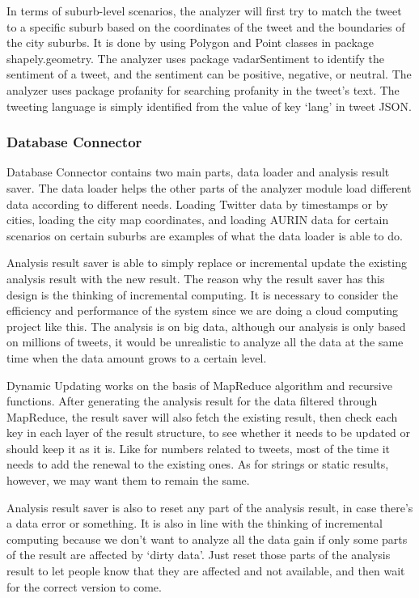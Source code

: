\documentclass{article}
\begin{document}
In terms of suburb-level scenarios, the analyzer will first try to match the tweet to a specific suburb based on the coordinates of the tweet and the boundaries of the city suburbs. It is done by using Polygon and Point classes in package shapely.geometry. The analyzer uses package vadarSentiment to identify the sentiment of a tweet, and the sentiment can be positive, negative, or neutral. The analyzer uses package profanity for searching profanity in the tweet’s text. The tweeting language is simply identified from the value of key ‘lang’ in tweet JSON.
\subsubsection{Database Connector}
Database Connector contains two main parts, data loader and analysis result saver. The data loader helps the other parts of the analyzer module load different data according to different needs. Loading Twitter data by timestamps or by cities, loading the city map coordinates, and loading AURIN data for certain scenarios on certain suburbs are examples of what the data loader is able to do.

Analysis result saver is able to simply replace or incremental update the existing analysis result with the new result. The reason why the result saver has this design is the thinking of incremental computing. It is necessary to consider the efficiency and performance of the system since we are doing a cloud computing project like this. The analysis is on big data, although our analysis is only based on millions of tweets, it would be unrealistic to analyze all the data at the same time when the data amount grows to a certain level. 

Dynamic Updating works on the basis of MapReduce algorithm and recursive functions. After generating the analysis result for the data filtered through MapReduce, the result saver will also fetch the existing result, then check each key in each layer of the result structure, to see whether it needs to be updated or should keep it as it is. Like for numbers related to tweets, most of the time it needs to add the renewal to the existing ones. As for strings or static results, however, we may want them to remain the same.

Analysis result saver is also to reset any part of the analysis result, in case there’s a data error or something. It is also in line with the thinking of incremental computing because we don’t want to analyze all the data gain if only some parts of the result are affected by ‘dirty data’. Just reset those parts of the analysis result to let people know that they are affected and not available, and then wait for the correct version to come.
\end{document}
